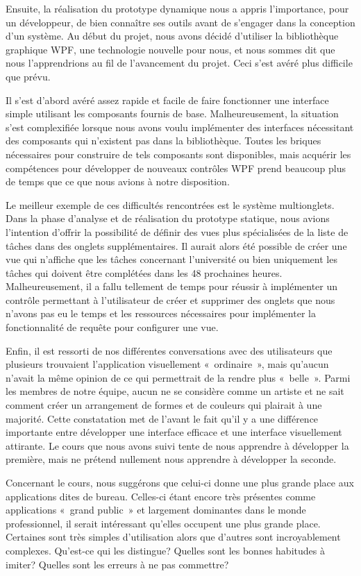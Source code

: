 \documentclass[letterpaper, oneside, 12pt, these, creativecommons]{thETS}
\begin{document}
Ensuite, la réalisation du prototype dynamique nous a appris l'importance, pour un développeur, de bien connaître ses outils avant de s'engager dans la conception d'un système. Au début du projet, nous avons décidé d'utiliser la bibliothèque graphique WPF, une technologie nouvelle pour nous, et nous sommes dit que nous l'apprendrions au fil de l'avancement du projet. Ceci s'est avéré plus difficile que prévu.

Il s'est d'abord avéré assez rapide et facile de faire fonctionner une interface simple utilisant les composants fournis de base. Malheureusement, la situation s'est complexifiée lorsque nous avons voulu implémenter des interfaces nécessitant des composants qui n'existent pas dans la bibliothèque. Toutes les briques nécessaires pour construire de tels composants sont disponibles, mais acquérir les compétences pour développer de nouveaux contrôles WPF prend beaucoup plus de temps que ce que nous avions à notre disposition.

Le meilleur exemple de ces difficultés rencontrées est le système multionglets. Dans la phase d'analyse et de réalisation du prototype statique, nous avions l'intention d'offrir la possibilité de définir des vues plus spécialisées de la liste de tâches dans des onglets supplémentaires. Il aurait alors été possible de créer une vue qui n'affiche que les tâches concernant l'université ou bien uniquement les tâches qui doivent être complétées dans les 48 prochaines heures. Malheureusement, il a fallu tellement de temps pour réussir à implémenter un contrôle permettant à l'utilisateur de créer et supprimer des onglets que nous n'avons pas eu le temps et les ressources nécessaires pour implémenter la fonctionnalité de requête pour configurer une vue.

Enfin, il est ressorti de nos différentes conversations avec des utilisateurs que plusieurs trouvaient l'application visuellement « ordinaire », mais qu'aucun n'avait la même opinion de ce qui permettrait de la rendre plus « belle ». Parmi les membres de notre équipe, aucun ne se considère comme un artiste et ne sait comment créer un arrangement de formes et de couleurs qui plairait à une majorité. Cette constatation met de l'avant le fait qu'il y a une différence importante entre développer une interface efficace et une interface visuellement attirante. Le cours que nous avons suivi tente de nous apprendre à développer la première, mais ne prétend nullement nous apprendre à développer la seconde.

Concernant le cours, nous suggérons que celui-ci donne une plus grande place aux applications dites de bureau. Celles-ci étant encore très présentes comme applications « grand public » et largement dominantes dans le monde professionnel, il serait intéressant qu'elles occupent une plus grande place. Certaines sont très simples d'utilisation alors que d'autres sont incroyablement complexes. Qu'est-ce qui les distingue? Quelles sont les bonnes habitudes à imiter? Quelles sont les erreurs à ne pas commettre?
\end{document}
